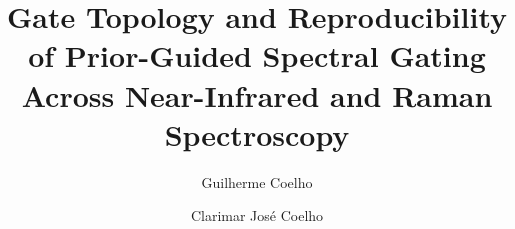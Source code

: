 \documentclass[preprint,12pt]{elsarticle}
\begin{document}
\begin{frontmatter}

\title{Gate Topology and Reproducibility of Prior-Guided Spectral Gating Across Near-Infrared and Raman Spectroscopy}

\author[unicamp]{Guilherme Coelho}
\author[puc]{Clarimar José Coelho}
\address[unicamp]{State University of Campinas, 
            Cidade Universitária Zeferino Vaz - Barão Geraldo, 
            Campinas,
            13083--970, 
            São Paulo,
            Brazil}
\address[puc]{Postgraduate Program in Industrial Engineering and Artificial Intelligence Pontificia Universidade Catolica de Goias, Primeira Avenida, s/n - Quadra 88 - Setor Leste Universitário, 
            Goiânia, 74605--010, Goiás, Brazil} 



\end{frontmatter}
\end{document}
